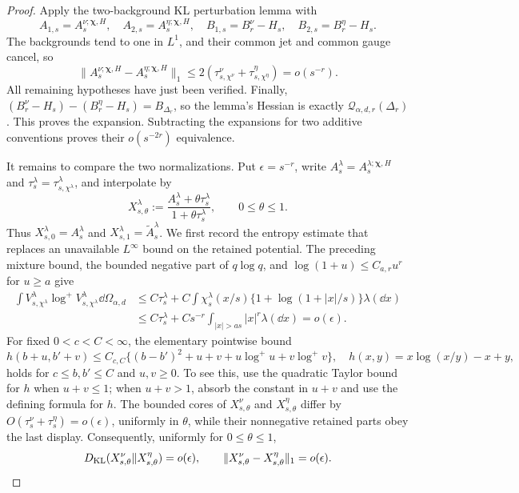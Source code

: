 \begin{proof}
Apply the two-background KL perturbation lemma with
\[
 A_{1,s}=A_s^{\nu;\boldsymbol\chi,H},\quad
 A_{2,s}=A_s^{\eta;\boldsymbol\chi,H},\quad
 B_{1,s}=B_r^\nu-H_s,\quad B_{2,s}=B_r^\eta-H_s.
\]
The backgrounds tend to one in \(L^1\), and their common jet and common
gauge cancel, so
\[
 \|A_s^{\nu;\boldsymbol\chi,H}
       -A_s^{\eta;\boldsymbol\chi,H}\|_1
 \le2(\tau_{s,\chi^\nu}^\nu+\tau_{s,\chi^\eta}^\eta)=o(s^{-r}).
\]
All remaining hypotheses have just been verified.  Finally,
\((B_r^\nu-H_s)-(B_r^\eta-H_s)=B_{\Delta_r}\), so the lemma's Hessian is
exactly \(\mathcal Q_{\alpha,d,r}(\Delta_r)\).  This proves the expansion.
Subtracting the expansions for two additive conventions proves their
\(o(s^{-2r})\) equivalence.

It remains to compare the two normalizations.  Put \(\epsilon=s^{-r}\),
write \(A_s^\lambda=A_s^{\lambda;\boldsymbol\chi,H}\) and
\(\tau_s^\lambda=\tau_{s,\chi^\lambda}^\lambda\), and interpolate by
\[
 X_{s,\theta}^\lambda
 :=\frac{A_s^\lambda+\theta\tau_s^\lambda}
         {1+\theta\tau_s^\lambda},\qquad 0\le\theta\le1.
\]
Thus \(X_{s,0}^\lambda=A_s^\lambda\) and
\(X_{s,1}^\lambda=\widetilde A_s^\lambda\).  We first record the entropy
estimate that replaces an unavailable \(L^\infty\) bound on the retained
potential.  The preceding mixture bound, the bounded negative part of
\(q\log q\), and \(\log(1+u)\le C_{a,r}u^r\) for \(u\ge a\) give
\begin{align*}
 \int V_{s,\chi^\lambda}^\lambda
       \log^+V_{s,\chi^\lambda}^\lambda\dd\Omega_{\alpha,d}
 &\le C\tau_s^\lambda
   +C\int\chi_s^\lambda(x/s)
          \{1+\log(1+|x|/s)\}\lambda(\dd x)\\
 &\le C\tau_s^\lambda
   +Cs^{-r}\int_{|x|>as}|x|^r\lambda(\dd x)
 =o(\epsilon).
\end{align*}
For fixed \(0<c<C<\infty\), the elementary pointwise bound
\[
 h(b+u,b'+v)\le C_{c,C}
 \{(b-b')^2+u+v+u\log^+u+v\log^+v\},
 \quad h(x,y)=x\log(x/y)-x+y,
\]
holds for \(c\le b,b'\le C\) and \(u,v\ge0\).  To see this, use the
quadratic Taylor bound for \(h\) when \(u+v\le1\); when \(u+v>1\), absorb
the constant in \(u+v\) and use the defining formula for \(h\).
The bounded cores of \(X_{s,\theta}^\nu\) and
\(X_{s,\theta}^\eta\) differ by
\(O(\tau_s^\nu+\tau_s^\eta)=o(\epsilon)\), uniformly in \(\theta\), while
their nonnegative retained parts obey the last display.  Consequently,
uniformly for \(0\le\theta\le1\),
\[
 D_{\rm KL}(X_{s,\theta}^\nu\|X_{s,\theta}^\eta)=o(\epsilon),
 \qquad
 \|X_{s,\theta}^\nu-X_{s,\theta}^\eta\|_1=o(\epsilon).
\]


\end{proof}
